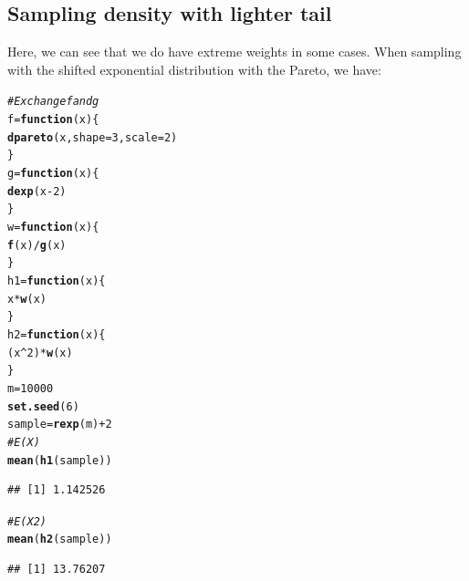 \documentclass[11pt]{article}\usepackage[]{graphicx}\usepackage[]{color}
\makeatletter
\newcommand{\hlnum}[1]{\textcolor[rgb]{0.686,0.059,0.569}{#1}}%
\newcommand{\hlcom}[1]{\textcolor[rgb]{0.678,0.584,0.686}{\textit{#1}}}%
\newcommand{\hlopt}[1]{\textcolor[rgb]{0,0,0}{#1}}%
\newcommand{\hlstd}[1]{\textcolor[rgb]{0.345,0.345,0.345}{#1}}%
\newcommand{\hlkwa}[1]{\textcolor[rgb]{0.161,0.373,0.58}{\textbf{#1}}}%
\newcommand{\hlkwb}[1]{\textcolor[rgb]{0.69,0.353,0.396}{#1}}%
\newcommand{\hlkwc}[1]{\textcolor[rgb]{0.333,0.667,0.333}{#1}}%
\newcommand{\hlkwd}[1]{\textcolor[rgb]{0.737,0.353,0.396}{\textbf{#1}}}%
\newenvironment{kframe}{%
 \def\at@end@of@kframe{}%
 \ifinner\ifhmode%
  \def\at@end@of@kframe{\end{minipage}}%
  \begin{minipage}{\columnwidth}%
 \fi\fi%
 \def\FrameCommand##1{\hskip\@totalleftmargin \hskip-\fboxsep
 \colorbox{shadecolor}{##1}\hskip-\fboxsep
     \hskip-\linewidth \hskip-\@totalleftmargin \hskip\columnwidth}%
 \MakeFramed {\advance\hsize-\width
   \@totalleftmargin\z@ \linewidth\hsize
   \@setminipage}}%
 {\par\unskip\endMakeFramed%
 \at@end@of@kframe}
\newenvironment{knitrout}{}{} %
\makeatother
\begin{document}
\subsection{Sampling density with lighter tail}
Here, we can see that we do have extreme weights in some cases. When sampling with the shifted exponential distribution with the Pareto, we have:
\begin{knitrout}
\color{fgcolor}\begin{kframe}
\begin{alltt}
\hlcom{# Exchange f and g}
\hlstd{f} \hlkwb{=} \hlkwa{function}\hlstd{(}\hlkwc{x}\hlstd{)\{}
  \hlkwd{dpareto}\hlstd{(x,}\hlkwc{shape}\hlstd{=}\hlnum{3}\hlstd{,}\hlkwc{scale}\hlstd{=}\hlnum{2}\hlstd{)}
\hlstd{\}}
\hlstd{g} \hlkwb{=} \hlkwa{function}\hlstd{(}\hlkwc{x}\hlstd{)\{}
  \hlkwd{dexp}\hlstd{(x}\hlopt{-}\hlnum{2}\hlstd{)}
\hlstd{\}}
\hlstd{w}\hlkwb{=}\hlkwa{function}\hlstd{(}\hlkwc{x}\hlstd{)\{}
  \hlkwd{f}\hlstd{(x)}\hlopt{/}\hlkwd{g}\hlstd{(x)}
\hlstd{\}}
\hlstd{h1}\hlkwb{=}\hlkwa{function}\hlstd{(}\hlkwc{x}\hlstd{)\{}
  \hlstd{x}\hlopt{*}\hlkwd{w}\hlstd{(x)}
\hlstd{\}}
\hlstd{h2}\hlkwb{=}\hlkwa{function}\hlstd{(}\hlkwc{x}\hlstd{)\{}
  \hlstd{(x}\hlopt{^}\hlnum{2}\hlstd{)}\hlopt{*}\hlkwd{w}\hlstd{(x)}
\hlstd{\}}
\hlstd{m}\hlkwb{=}\hlnum{10000}
\hlkwd{set.seed}\hlstd{(}\hlnum{6}\hlstd{)}
\hlstd{sample}\hlkwb{=}\hlkwd{rexp}\hlstd{(m)}\hlopt{+}\hlnum{2}
\hlcom{#E(X)}
\hlkwd{mean}\hlstd{(}\hlkwd{h1}\hlstd{(sample))}
\end{alltt}
\begin{verbatim}
## [1] 1.142526
\end{verbatim}
\begin{alltt}
\hlcom{#E(X2)}
\hlkwd{mean}\hlstd{(}\hlkwd{h2}\hlstd{(sample))}
\end{alltt}
\begin{verbatim}
## [1] 13.76207
\end{verbatim}
\end{kframe}
\end{knitrout}
\end{document}
